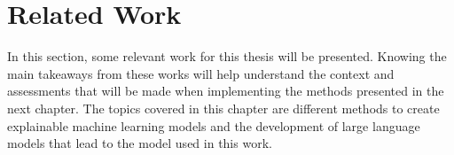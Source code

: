 \label{sec:2_related_work}
\section{Related Work} 

In this section, some relevant work for this thesis will be presented. Knowing the main takeaways from these works will help understand the context and assessments that will be made when implementing the methods presented in the next chapter. 
The topics covered in this chapter are different methods to create explainable machine learning models and the development of large language models that lead to the model used in this work.





